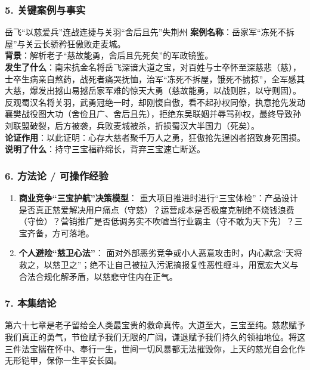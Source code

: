 \subsubsection{5. 关键案例与事实}
\begin{CaseBox}{岳飞“以慈爱兵”连战连捷与关羽“舍后且先”失荆州}
\textbf{案例名称}：岳家军“冻死不拆屋”与关云长骄矜狂傲败走麦城。\\
\textbf{背景}：解析老子“慈故能勇，舍后且先死矣”的军政镜鉴。\\
\textbf{发生了什么}：南宋抗金名将岳飞深谙大道之宝，对百姓与士卒怀至深慈悲（慈），士卒生病亲自熬药，战死者痛哭抚恤，治军“冻死不拆屋，饿死不掳掠”，全军感其大慈，爆发出撼山易撼岳家军难的惊天大勇（慈故能勇，以战则胜，以守则固）。反观蜀汉名将关羽，武勇冠绝一时，却刚愎自傲，看不起孙权同僚，执意抢先发动襄樊战役图大功（舍俭且广、舍后且先），拒绝东吴联姻并辱骂孙权，最终导致孙刘联盟破裂，后方被袭，兵败麦城被杀，折损蜀汉大半国力（死矣）。\\
\textbf{论证作用}：以此证明：心存大慈者聚千万人之勇，狂傲抢先逞凶者招致身死国损。\\
\textbf{说明了什么}：持守三宝福祚绵长，背弃三宝速亡断送。
\end{CaseBox}

\subsubsection{6. 方法论 / 可操作经验}
\begin{enumerate}
    \item \textbf{商业竞争“三宝护航”决策模型}：
    重大项目推进时进行“三宝体检”：产品设计是否真正慈爱解决用户痛点（守慈）？运营成本是否极度克制绝不烧钱浪费（守俭）？营销推广是否低调务实不吹嘘当行业霸主（守不敢为天下先）？三宝齐备，方可落地。
    \item \textbf{个人避险“慈卫心法”}：
    面对外部恶劣竞争或小人恶意攻击时，内心默念“天将救之，以慈卫之”；绝不让自己被拉入污泥搞报复性恶性缠斗，用宽宏大义与合法合规化解矛盾，以慈悲守住内在正气。
\end{enumerate}

\subsubsection{7. 本集结论}
第六十七章是老子留给全人类最宝贵的救命真传。大道至大，三宝至纯。慈悲赋予我们真正的勇气，节俭赋予我们无限的广阔，谦退赋予我们持久的领袖地位。将这三件法宝揣在怀中、奉行一生，世间一切风暴都无法摧毁你，上天的慈光自会化作无形铠甲，保你一生平安长固。

